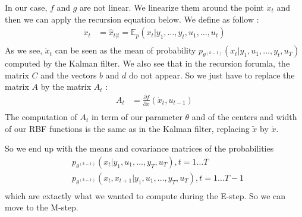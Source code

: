 In our case, $f$ and $g$ are not linear.
We linearize them around the point $\dot{x}_t$ and then we can apply the recursion equation below.
We define  as follow :
\begin{align*}
  \dot{x}_t &= \hat{x}_{t|t} = \mathbb{E}_p(x_t|y_1, \ldots , y_t, u_1, \ldots , u_t) \\
\end{align*}
As we see, $\dot{x}_t$ can be seen as the mean of probability  $p_{\theta^{(k-1)}}\left(x_t|y_1, u_1, \ldots, y_t, u_T \right )$ computed by the Kalman filter.
We also see that in the recursion forumla, the matrix $C$ and the vectors $b$ and $d$ do not appear.
So we just have to replace the matrix $A$ by the matrix $A_t$ :
\begin{align*}
  A_t &= \frac{\partial f}{\partial x}(\dot{x}_t, u_{t-1})\\
\end{align*}
The computation of $A_t$ in term of our parameter $\theta$ and of the centers and width of our RBF functions is the same as in the Kalman filter, replacing $\tilde{x}$ by $\dot{x}$.

So we end up with the means and covariance matrices of the probabilities
\begin{align*}
  &p_{\theta^{(k-1)}}\left(x_t|y_1, u_1, \ldots, y_T, u_T \right ), t=1 \ldots T\\
  &p_{\theta^{(k-1)}}\left(x_t, x_{t+1}|y_1, u_1, \ldots, y_T, u_T \right ), t=1 \ldots T-1\\
\end{align*}
which are extactly what we wanted to compute during the E-step.
So we can move to the M-step.
